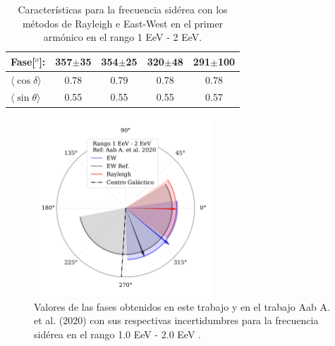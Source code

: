 \begin{table}[H]
\begin{small}
\begin{center}
\begin{tabular}[c]{l|c|c|c||c|}
\multicolumn{1}{|l|}{Fase[$^o$]:             }  & 357$\pm$35             & 354$\pm$25                   & 320$\pm$48                 & 291$\pm$100      \\\hline
\multicolumn{1}{|l|}{$\langle\cos\delta\rangle$}&{0.78}& 0.79 &{0.78}                        & 0.78       \\        
\multicolumn{1}{|l|}{$\langle\sin\theta\rangle$}&{0.55}& 0.55 &{0.55}                        & 0.57       \\ \hline       
\end{tabular}
            \end{center}
        \end{small}
        \caption{Características para la frecuencia sidérea con los métodos de Rayleigh  e East-West en el primer armónico en el rango 1 EeV - 2 EeV.}
        \label{tab:siderea_3}
    \end{table}

    \begin{figure}[H]
        \begin{small}
            \begin{center}
                \vspace*{-0.2 cm}
                \includegraphics[width=0.6\textwidth]{phase_tercer_bin_v3.pdf}
                \vspace*{-1 cm}
            \end{center}
        \caption{Valores de las fases obtenidos en este trabajo y en el trabajo Aab A. et al. (2020) con sus respectivas incertidumbres para la frecuencia sidérea en el  rango 1.0 EeV - 2.0 EeV .}
        \label{fig:tercer}
        \end{small}
    \end{figure}


